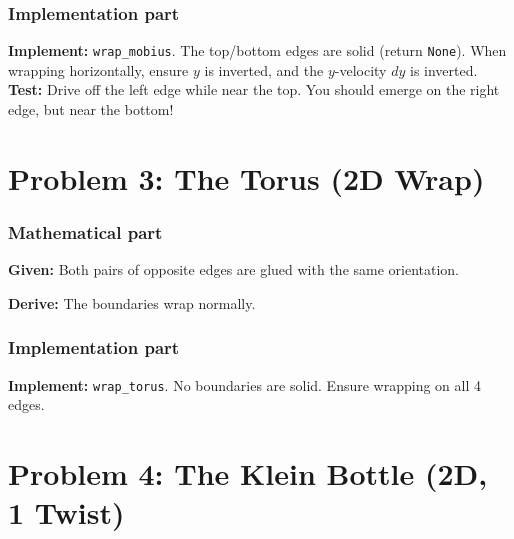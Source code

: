 \documentclass[11pt]{article}
\begin{document}
\subsubsection*{Implementation part}
\textbf{Implement:} \lstinline|wrap_mobius|. The top/bottom edges are solid (return \lstinline|None|). When wrapping horizontally, ensure $y$ is inverted, and the $y$-velocity $dy$ is inverted.
\textbf{Test:} Drive off the left edge while near the top. You should emerge on the right edge, but near the bottom!


\section*{Problem 3: The Torus (2D Wrap)}

\subsubsection*{Mathematical part}
\textbf{Given:} Both pairs of opposite edges are glued with the same orientation.
\begin{center}
\end{center}
\textbf{Derive:} The boundaries wrap normally.

\subsubsection*{Implementation part}
\textbf{Implement:} \lstinline|wrap_torus|. No boundaries are solid. Ensure wrapping on all 4 edges.


\section*{Problem 4: The Klein Bottle (2D, 1 Twist)}
\end{document}
